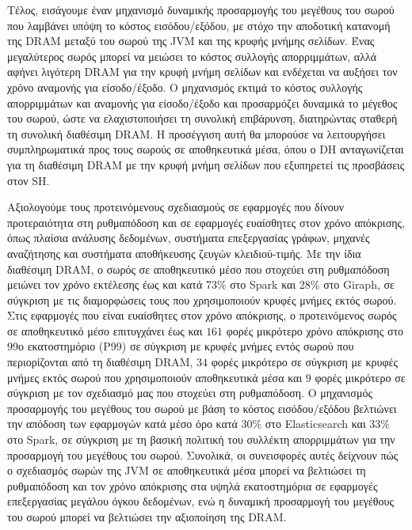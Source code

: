 {  Τέλος, εισάγουμε έναν μηχανισμό δυναμικής προσαρμογής του μεγέθους του σωρού που λαμβάνει υπόψη το κόστος εισόδου/εξόδου, με στόχο την αποδοτική κατανομή της \selam DRAM\selg{} μεταξύ του σωρού της \selam JVM\selg{} και της κρυφής μνήμης σελίδων.
  Ένας μεγαλύτερος σωρός μπορεί να μειώσει το κόστος συλλογής απορριμμάτων, αλλά αφήνει λιγότερη \selam DRAM\selg{} για την κρυφή μνήμη σελίδων και ενδέχεται να αυξήσει τον χρόνο αναμονής για είσοδο/έξοδο.
  Ο μηχανισμός εκτιμά το κόστος συλλογής απορριμμάτων και αναμονής για είσοδο/έξοδο και προσαρμόζει δυναμικά το μέγεθος του σωρού, ώστε να ελαχιστοποιήσει τη συνολική επιβάρυνση, διατηρώντας σταθερή τη συνολική διαθέσιμη \selam DRAM\selg.
  Η προσέγγιση αυτή θα μπορούσε να λειτουργήσει συμπληρωματικά προς τους σωρούς σε αποθηκευτικά μέσα, όπου ο \selam DH\selg{} ανταγωνίζεται για τη διαθέσιμη \selam DRAM\selg{} με την κρυφή μνήμη σελίδων που εξυπηρετεί τις προσβάσεις στον \selam SH\selg.

  Αξιολογούμε τους προτεινόμενους σχεδιασμούς σε εφαρμογές που δίνουν προτεραιότητα στη ρυθμαπόδοση και σε εφαρμογές ευαίσθητες στον χρόνο απόκρισης, όπως πλαίσια ανάλυσης δεδομένων, συστήματα επεξεργασίας γράφων, μηχανές αναζήτησης και συστήματα αποθήκευσης ζευγών κλειδιού-τιμής.
  Με την ίδια διαθέσιμη \selam DRAM\selg, ο σωρός σε αποθηκευτικό μέσο που στοχεύει στη ρυθμαπόδοση μειώνει τον χρόνο εκτέλεσης έως και κατά 73\% στο \selam Spark\selg{} και 28\% στο \selam Giraph\selg, σε σύγκριση με τις διαμορφώσεις τους που χρησιμοποιούν κρυφές μνήμες εκτός σωρού.
  Στις εφαρμογές που είναι ευαίσθητες στον χρόνο απόκρισης, ο προτεινόμενος σωρός σε αποθηκευτικό μέσο επιτυγχάνει έως και $161$ φορές μικρότερο χρόνο απόκρισης στο 99ο εκατοστημόριο (\selam P99\selg) σε σύγκριση με κρυφές μνήμες εντός σωρού που περιορίζονται από τη διαθέσιμη \selam DRAM\selg, $34$ φορές μικρότερο σε σύγκριση με κρυφές μνήμες εκτός σωρού που χρησιμοποιούν αποθηκευτικά μέσα και $9$ φορές μικρότερο σε σύγκριση με τον σχεδιασμό μας που στοχεύει στη ρυθμαπόδοση.
  Ο μηχανισμός προσαρμογής του μεγέθους του σωρού με βάση το κόστος εισόδου/εξόδου βελτιώνει την απόδοση των εφαρμογών κατά μέσο όρο κατά 30\% στο \selam Elasticsearch\selg{} και 33\% στο \selam Spark\selg, σε σύγκριση με τη βασική πολιτική του συλλέκτη απορριμμάτων για την προσαρμογή του μεγέθους του σωρού.
  Συνολικά, οι συνεισφορές αυτές δείχνουν πώς ο σχεδιασμός σωρών της \selam JVM\selg{} σε αποθηκευτικά μέσα μπορεί να βελτιώσει τη ρυθμαπόδοση και τον χρόνο απόκρισης στα υψηλά εκατοστημόρια σε εφαρμογές επεξεργασίας μεγάλου όγκου δεδομένων, ενώ η δυναμική προσαρμογή του μεγέθους του σωρού μπορεί να βελτιώσει την αξιοποίηση της \selam DRAM\selg.

}

